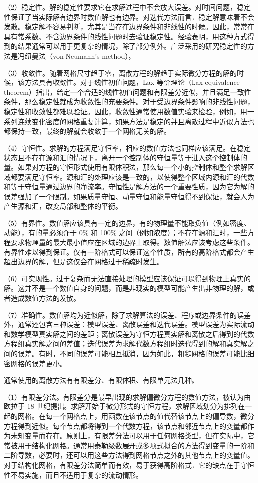 （2）稳定性。解的稳定性要求它在求解过程中不会放大误差。对时间问题，稳定性保证了当实际解有边界时数值解也有边界。对迭代方法而言，稳定解意味着不会发散。稳定解不容易判断，尤其是当存在边界条件和非线性的时候。因此，常常在具有常系数、不含边界条件的线性问题时去验证稳定性。经验表明，用这种方式得到的结果通常可以用于更复杂的情况，除了部分例外。广泛采用的研究稳定性的方法是冯纽曼法（von Neumann's method）。

（3）收敛性。随着网格尺寸趋于零，离散方程的解趋于实际微分方程的解的时候，该方法具有收敛性。对于线性初值问题，Lax 等价理论（Lax equivalence theorem）\cite{Richtmyer1967}指出，给定一个合适的线性初值问题和有限差分近似，并且满足一致性条件，那么稳定性就成为收敛性的充要条件。对于受边界条件影响的非线性问题，稳定性和收敛性都难以验证。因此，收敛性通常使用数值实验来检验，例如，用一系列连续变化密度的网格重复计算，如果方法是稳定的并且离散过程中近似方法也都保持一致，最终的解就会收敛于一个网格无关的解。

（4）守恒性。求解的方程满足守恒率，相应的数值方法也同样应该满足。在稳定状态且不存在源和汇的情况下，离开一个控制体的守恒量等于进入这个控制体的量。如果对方程的守恒形式使用有限体积法，那么每一个小的控制体和整个求解区域都要满足守恒率。源和汇的处理应该是一致的，以使得整个区域内源和汇的代数和等于守恒量通过边界的净流率。守恒性是解方法的一个重要性质，因为它为解的误差强加了一个限制。如果质量守恒、动量守恒和能量守恒得不到保证，就会人为产生源和汇，改变局部和整体的平衡。

（5）有界性。数值解应该具有一定的边界，有的物理量不能取负值（例如密度、动能），有的量必须介于 0\% 和 100\% 之间（例如浓度）；不存在源和汇时，一些方程要求物理量的最大最小值应在区域的边界上取得。数值解法应该考虑这些条件。有界性难以得到保证。仅有一阶格式可以保证这个性质，所有的高阶格式都会产生超出边界的解，但是这仅会在网格过于稀疏时发生。

（6）可实现性。过于复杂而无法直接处理的模型应该保证可以得到物理上真实的解。这并不是一个数值自身的问题，而是非现实的模型可能产生出非物理的解，或者造成数值方法的发散。

（7）准确性。数值解均为近似解，除了求解算法的误差、程序或边界条件的误差外，通常还包含三种误差：模型误差、离散误差和迭代误差。模型误差为实际流动和数学模型真实解之间的差距；离散误差为守恒方程真实解和离散之后得到的代数方程组真实解之间的差值；迭代误差为求解代数方程组时迭代得到的解和真实解之间的误差。有时，不同的误差可能相互抵消，因为如此，粗糙网格的误差可能比细密网格的误差更小。

通常使用的离散方法有有限差分、有限体积、有限单元法几种。

（1）有限差分法。有限差分是最早出现的求解偏微分方程的数值方法，被认为由欧拉于 18 世纪提出。求解开始于微分形式的守恒方程，求解区域划分为排列在一起的网格。在每一个网格点上，用函数在该节点的值代替该节点上的偏导数，微分方程得到近似。每个节点都将得到一个代数方程，该节点和邻近节点上的变量都作为未知变量而存在。原则上，有限差分法可以用于任何网格类型，但在实际中，它常被用于结构化网格。通常用泰勒级数展开或多项式拟合的方法得到变量的一阶和二阶导数，必要时，还可以用这些方法得到网格节点之外的其他节点上的变量值。对于结构化网格，有限差分法简单而有效，易于获得高阶格式，它的缺点在于守恒性不易实施，而且不适用于复杂的流动情形。

